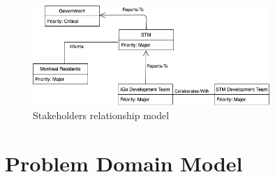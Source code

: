 \documentclass[11pt, english]{report}
\begin{document}
  \begin{figure}[H]
  
  \includegraphics[width=0.8\textwidth]{images/stake_relationship.png}
  \centering
  \caption{ Stakeholders relationship model}

\end{figure}




\section{Problem Domain Model}
\end{document}
